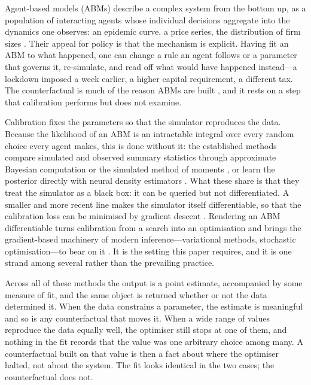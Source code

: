\documentclass[10pt,twocolumn]{article}
\begin{document}
Agent-based models (ABMs) describe a complex system from the bottom up, as a
population of interacting agents whose individual decisions aggregate into the
dynamics one observes: an epidemic curve, a price series, the distribution of firm
sizes \citep{farmer2009economy, bonabeau2002agent}. Their appeal for policy is
that the mechanism is explicit. Having fit an ABM to what happened, one can change
a rule an agent follows or a parameter that governs it, re-simulate, and read off
what would have happened instead---a lockdown imposed a week earlier, a higher
capital requirement, a different tax. The counterfactual is much of the reason
ABMs are built \citep{axtell2022agent}, and it rests on a step that calibration
performs but does not examine.

Calibration fixes the parameters so that the simulator reproduces the data. Because
the likelihood of an ABM is an intractable integral over every random choice every
agent makes, this is done without it: the established methods compare simulated and
observed summary statistics through approximate Bayesian computation or the
simulated method of moments \citep{grazzini2017bayesian, platt2020comparison}, or
learn the posterior directly with neural density estimators
\citep{cranmer2020frontier, dyer2024black}. What these share is that they treat the
simulator as a black box: it can be queried but not differentiated. A smaller and
more recent line makes the simulator itself differentiable, so that the calibration
loss can be minimised by gradient descent
\citep{andelfinger2023towards, chopra2023differentiable, querabofarull2025automatic}.
Rendering an ABM differentiable turns calibration from a search into an
optimisation and brings the gradient-based machinery of modern inference---variational
methods, stochastic optimisation---to bear on it \citep{querabofarull2023bayesian}.
It is the setting this paper requires, and it is one strand among several rather
than the prevailing practice.

Across all of these methods the output is a point estimate, accompanied by some
measure of fit, and the same object is returned whether or not the data determined
it. When the data constrains a parameter, the estimate is meaningful and so is any
counterfactual that moves it. When a wide range of values reproduce the data
equally well, the optimiser still stops at one of them, and nothing in the fit
records that the value was one arbitrary choice among many. A counterfactual built
on that value is then a fact about where the optimiser halted, not about the system.
The fit looks identical in the two cases; the counterfactual does not.
\end{document}

